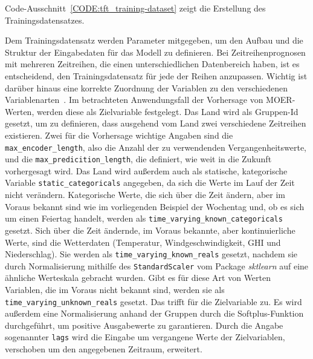 Code-Ausschnitt~\ref{CODE:tft_training-dataset} zeigt die Erstellung des Trainingsdatensatzes.

Dem Trainingsdatensatz werden Parameter mitgegeben, um den Aufbau und die Struktur der Eingabedaten für das Modell zu definieren.
Bei Zeitreihenprognosen mit mehreren Zeitreihen, die einen unterschiedlichen Datenbereich haben, ist es entscheidend, den Trainingsdatensatz für jede der Reihen anzupassen.
Wichtig ist darüber hinaus eine korrekte Zuordnung der Variablen zu den verschiedenen Variablenarten~\cite{GitHub.20240307T20:56:16.000Z}.
Im betrachteten Anwendungsfall der Vorhersage von \ac{MOER}-Werten, werden diese als Zielvariable festgelegt.
Das Land wird als Gruppen-Id gesetzt, um zu definieren, dass ausgehend vom Land zwei verschiedene Zeitreihen existieren.
Zwei für die Vorhersage wichtige Angaben sind die \lstinline[columns=fixed]{max_encoder_length}, also die Anzahl der zu verwendenden Vergangenheitswerte, und die \lstinline[columns=fixed]{max_predicition_length}, die definiert, wie weit in die Zukunft vorhergesagt wird.
Das Land wird außerdem auch als statische, kategorische Variable \lstinline[columns=fixed]{static_categoricals} angegeben, da sich die Werte im Lauf der Zeit nicht verändern.
Kategorische Werte, die sich über die Zeit ändern, aber im Voraus bekannt sind wie im vorliegenden Beispiel der Wochentag und, ob es sich um einen Feiertag handelt, werden als \lstinline[columns=fixed]{time_varying_known_categoricals} gesetzt.
Sich über die Zeit ändernde, im Voraus bekannte, aber kontinuierliche Werte, sind die Wetterdaten (Temperatur, Windgeschwindigkeit, \ac{GHI} und Niederschlag).
Sie werden als \lstinline[columns=fixed]{time_varying_known_reals} gesetzt, nachdem sie durch Normalisierung mithilfe des \lstinline[columns=fixed]{StandardScaler} vom Package \textit{sktlearn} auf eine ähnliche Werteskala gebracht wurden.
Gibt es für diese Art von Werten Variablen, die im Voraus nicht bekannt sind, werden sie als \lstinline[columns=fixed]{time_varying_unknown_reals} gesetzt.
Das trifft für die Zielvariable zu.
Es wird außerdem eine Normalisierung anhand der Gruppen durch die Softplus-Funktion durchgeführt, um positive Ausgabewerte zu garantieren.
Durch die Angabe sogenannter \lstinline[columns=fixed]{lags} wird die Eingabe um vergangene Werte der Zielvariablen, verschoben um den angegebenen Zeitraum, erweitert.
